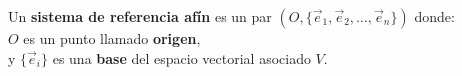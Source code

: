 \documentclass[preview]{standalone}
\begin{document}
\begin{center}
Un \textbf{sistema de referencia afín} es un par $(O, \{ \vec{e}_1, \vec{e}_2, \dots, \vec{e}_n \})$ donde:\\$O$ es un punto llamado \textbf{origen},\\y $\{ \vec{e}_i \}$ es una \textbf{base} del espacio vectorial asociado $V$.
\end{center}
\end{document}
